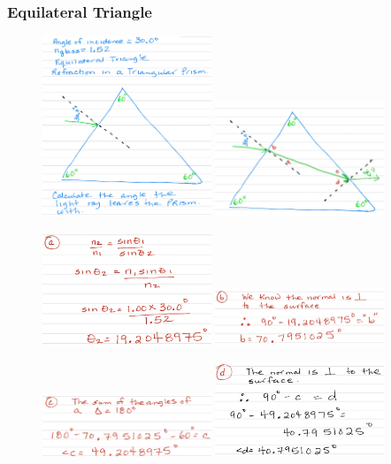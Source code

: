 \documentclass[a4paper,12pt]{article}
\begin{document}
\subsubsection{Equilateral Triangle}
\begin{figure}[H]
    \centering
    \includegraphics[width=0.45\textwidth]{ex-tri-1}
    \includegraphics[width=0.45\textwidth]{ex-tri-2}
\end{figure}
\begin{figure}[H]
    \centering
    \includegraphics[width=0.45\textwidth]{ex-tri-3}
    \includegraphics[width=0.45\textwidth]{ex-tri-4}
\end{figure}
\begin{figure}[H]
    \centering
    \includegraphics[width=0.45\textwidth]{ex-tri-5}
    \includegraphics[width=0.45\textwidth]{ex-tri-6}
\end{figure}
\end{document}
